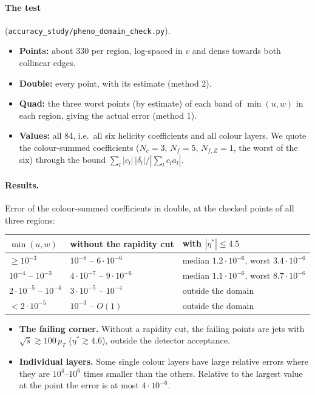 \documentclass[11pt]{article}
\begin{document}
\paragraph{The test} (\texttt{accuracy\_study/pheno\_domain\_check.py}).
\begin{itemize}
\item \textbf{Points:} about 330 per region, log-spaced in $v$ and dense towards both collinear edges.
\item \textbf{Double:} every point, with its estimate (method 2).
\item \textbf{Quad:} the three worst points (by estimate) of each band of $\min(u,w)$ in each region, giving the actual
  error (method 1).
\item \textbf{Values:} all 84, i.e.\ all six helicity coefficients and all colour layers. We quote the colour-summed
  coefficients ($N_c=3$, $N_f=5$, $N_{f,Z}=1$, the worst of the six) through the bound
  $\sum_l|c_l|\,|\delta_l|/|\sum_lc_la_l|$.
\end{itemize}

\paragraph{Results.} Error of the colour-summed coefficients in double, at the checked points of all three regions:
\begin{center}
\begin{tabular}{lll}\toprule
$\min(u,w)$ & without the rapidity cut & with $|\eta^*|\le4.5$ \\ \midrule
$\ge10^{-3}$ & $10^{-8}$ -- $6\cdot10^{-6}$ & median $1.2\cdot10^{-6}$, worst $3.4\cdot10^{-6}$ \\
$10^{-4}$ -- $10^{-3}$ & $4\cdot10^{-7}$ -- $9\cdot10^{-6}$ & median $1.1\cdot10^{-6}$, worst $8.7\cdot10^{-6}$ \\
$2\cdot10^{-5}$ -- $10^{-4}$ & $3\cdot10^{-5}$ -- $10^{-4}$ & outside the domain \\
$<2\cdot10^{-5}$ & $10^{-3}$ -- $O(1)$ & outside the domain \\ \bottomrule
\end{tabular}
\end{center}
\begin{itemize}
\item \textbf{The failing corner.} Without a rapidity cut, the failing points are jets with $\sqrt{\hat s}\gtrsim100\,p_T$
  ($\eta^*\gtrsim4.6$), outside the detector acceptance.
\item \textbf{Individual layers.} Some single colour layers have large relative errors where they are $10^4$--$10^6$
  times smaller than the others. Relative to the largest value at the point the error is at most $4\cdot10^{-6}$.
\end{itemize}
\end{document}
